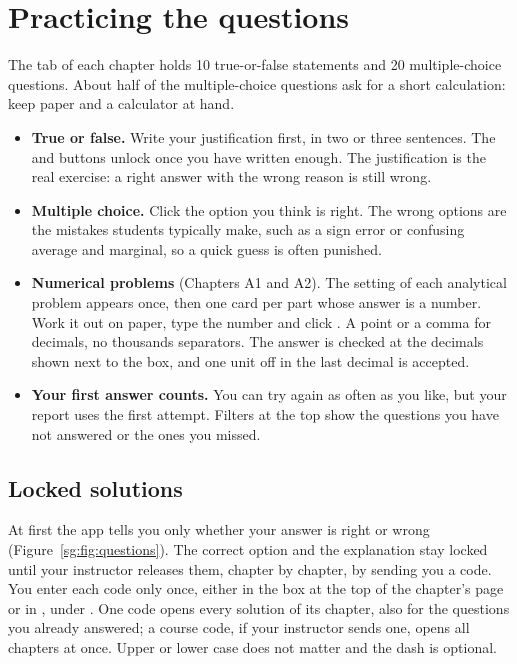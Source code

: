 \section{Practicing the questions}

The  tab of each chapter holds 10 true-or-false statements and 20 multiple-choice questions. About half of the multiple-choice questions ask for a short calculation: keep paper and a calculator at hand.
\begin{itemize}
  \item \textbf{True or false.} Write your justification first, in two or three sentences. The  and  buttons unlock once you have written enough. The justification is the real exercise: a right answer with the wrong reason is still wrong.
  \item \textbf{Multiple choice.} Click the option you think is right. The wrong options are the mistakes students typically make, such as a sign error or confusing average and marginal, so a quick guess is often punished.
  \item \textbf{Numerical problems} (Chapters A1 and A2). The setting of each analytical problem appears once, then one card per part whose answer is a number. Work it out on paper, type the number and click . A point or a comma for decimals, no thousands separators. The answer is checked at the decimals shown next to the box, and one unit off in the last decimal is accepted.
  \item \textbf{Your first answer counts.} You can try again as often as you like, but your report uses the first attempt. Filters at the top show the questions you have not answered or the ones you missed.
\end{itemize}

\subsection{Locked solutions}

At first the app tells you only whether your answer is right or wrong (Figure~\ref{sg:fig:questions}). The correct option and the explanation stay locked until your instructor releases them, chapter by chapter, by sending you a code. You enter each code only once, either in the box at the top of the chapter's  page or in , under . One code opens every solution of its chapter, also for the questions you already answered; a course code, if your instructor sends one, opens all chapters at once. Upper or lower case does not matter and the dash is optional.

